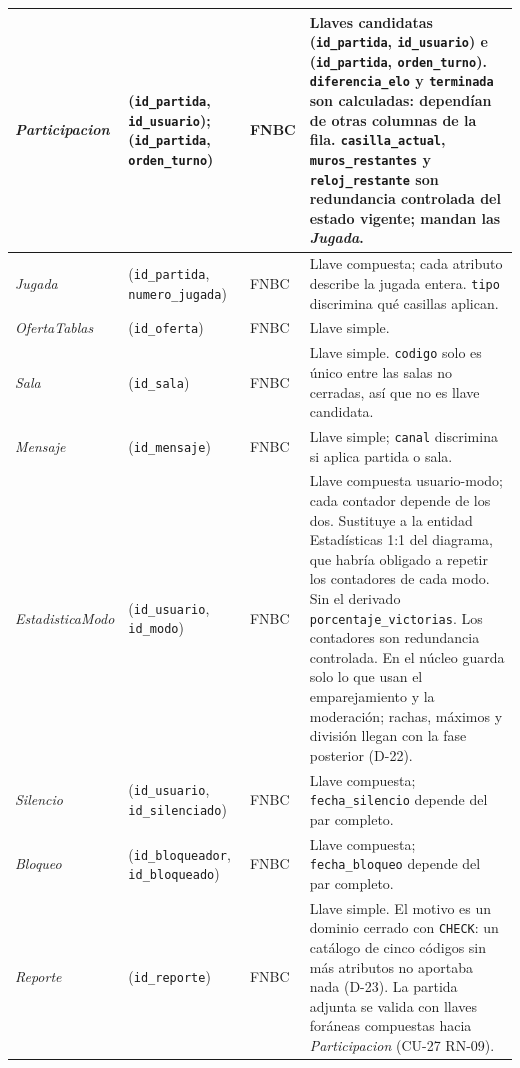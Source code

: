 \begin{center}
\begin{longtable}{|L{0.19\textwidth}|L{0.23\textwidth}|L{0.08\textwidth}|L{0.38\textwidth}|}
\textit{Participacion} & (\texttt{id\_\allowbreak{}partida}, \texttt{id\_\allowbreak{}usuario}); (\texttt{id\_\allowbreak{}partida}, \texttt{orden\_\allowbreak{}turno}) & FNBC & Llaves candidatas (\texttt{id\_\allowbreak{}partida}, \texttt{id\_\allowbreak{}usuario}) e (\texttt{id\_\allowbreak{}partida}, \texttt{orden\_\allowbreak{}turno}). \texttt{diferencia\_\allowbreak{}elo} y \texttt{terminada} son calculadas: dependían de otras columnas de la fila. \texttt{casilla\_\allowbreak{}actual}, \texttt{muros\_\allowbreak{}restantes} y \texttt{reloj\_\allowbreak{}restante} son redundancia controlada del estado vigente; mandan las \textit{Jugada}. \\ \hline
\textit{Jugada} & (\texttt{id\_\allowbreak{}partida}, \texttt{numero\_\allowbreak{}jugada}) & FNBC & Llave compuesta; cada atributo describe la jugada entera. \texttt{tipo} discrimina qué casillas aplican. \\ \hline
\textit{Oferta\-Tablas} & (\texttt{id\_\allowbreak{}oferta}) & FNBC & Llave simple. \\ \hline
\textit{Sala} & (\texttt{id\_\allowbreak{}sala}) & FNBC & Llave simple. \texttt{codigo} solo es único entre las salas no cerradas, así que no es llave candidata. \\ \hline
\textit{Mensaje} & (\texttt{id\_\allowbreak{}mensaje}) & FNBC & Llave simple; \texttt{canal} discrimina si aplica partida o sala. \\ \hline
\textit{Estadistica\-Modo} & (\texttt{id\_\allowbreak{}usuario}, \texttt{id\_\allowbreak{}modo}) & FNBC & Llave compuesta usuario-modo; cada contador depende de los dos. Sustituye a la entidad Estadísticas 1:1 del diagrama, que habría obligado a repetir los contadores de cada modo. Sin el derivado \texttt{porcentaje\_\allowbreak{}victorias}. Los contadores son redundancia controlada. En el núcleo guarda solo lo que usan el emparejamiento y la moderación; rachas, máximos y división llegan con la fase posterior (\mbox{D-22}). \\ \hline
\textit{Silencio} & (\texttt{id\_\allowbreak{}usuario}, \texttt{id\_\allowbreak{}silenciado}) & FNBC & Llave compuesta; \texttt{fecha\_\allowbreak{}silencio} depende del par completo. \\ \hline
\textit{Bloqueo} & (\texttt{id\_\allowbreak{}bloqueador}, \texttt{id\_\allowbreak{}bloqueado}) & FNBC & Llave compuesta; \texttt{fecha\_\allowbreak{}bloqueo} depende del par completo. \\ \hline
\textit{Reporte} & (\texttt{id\_\allowbreak{}reporte}) & FNBC & Llave simple. El motivo es un dominio cerrado con \texttt{CHECK}: un catálogo de cinco códigos sin más atributos no aportaba nada (\mbox{D-23}). La partida adjunta se valida con llaves foráneas compuestas hacia \textit{Participacion} (\mbox{CU-27} \mbox{RN-09}). \\ \hline

\end{longtable}
\end{center}
